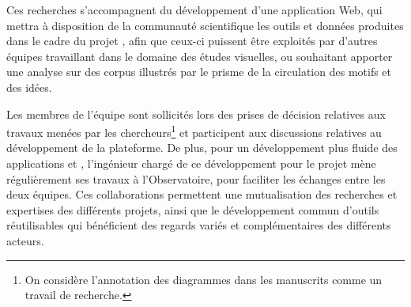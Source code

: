 	Ces recherches s'accompagnent du développement d'une application Web, qui mettra à disposition de la communauté scientifique les outils et données produites dans le cadre du projet \vhs, afin que ceux-ci puissent être exploités par d'autres équipes travaillant dans le domaine des études visuelles, ou souhaitant apporter une analyse sur des corpus illustrés par le prisme de la circulation des motifs et des idées. 
	
	 Les membres de l'équipe \imagine sont sollicités lors des prises de décision relatives aux travaux menées par les chercheurs\footnote{On considère l'annotation des diagrammes dans les manuscrits comme un travail de recherche.} et participent aux discussions relatives au développement de la plateforme. De plus, pour un développement plus fluide des applications \vhs et \eida, l'ingénieur chargé de ce développement pour le projet \vhs mène régulièrement ses travaux à l'Observatoire, pour faciliter les échanges entre les deux équipes. Ces collaborations permettent une mutualisation des recherches et expertises des différents projets, ainsi que le développement commun d'outils réutilisables qui bénéficient des regards variés et complémentaires des différents acteurs.